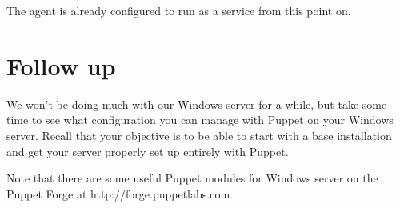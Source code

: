 \documentclass{article}   	%
\begin{document}
The agent is already configured to run as a service from this point on.

\section{Follow up}
We won't be doing much with our Windows server for a while, but take some time to see what configuration you can manage with Puppet on your Windows server.  Recall that your objective is to be able to start with a base installation and get your server properly set up entirely with Puppet.

Note that there are some useful Puppet modules for Windows server on the Puppet Forge at http://forge.puppetlabs.com.
\end{document}
